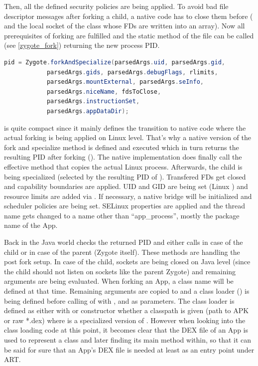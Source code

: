 Then, all the defined security policies are being applied. To avoid bad file
descriptor messages after forking a child, a native code has to close them before ( and the local socket  of the
 class whose FDs are written into an 
array).
Now all prerequisites of forking are fulfilled and the static method
 of the  file can be called
(see \autoref{zygote_fork}) returning the new process PID.
\begin{lstlisting}[language=Java, caption=Zygote Fork Call, label=zygote_fork]
pid = Zygote.forkAndSpecialize(parsedArgs.uid, parsedArgs.gid,
            parsedArgs.gids, parsedArgs.debugFlags, rlimits,
            parsedArgs.mountExternal, parsedArgs.seInfo,
            parsedArgs.niceName, fdsToClose,
            parsedArgs.instructionSet,
            parsedArgs.appDataDir);
\end{lstlisting}
 is quite compact since it mainly defines the transition
to native code where the actual forking is being applied on Linux level. That's why
a native version of the fork and specialize method is defined and executed
which in turn returns the resulting PID after forking
().
The native implementation does finally call the effective  method
that copies the actual Linux process. Afterwards, the child is being
specialized (selected by the resulting PID of ).
Transfered FDs get closed and capability boundaries are applied.
UID and GID are being set (Linux ) and resource limits are added via .
If necessary, a native bridge will be initialized and scheduler policies
are being set. SELinux properties are applied and the thread name gets
changed to a name other than ``app\_process'', mostly the package name of the App.

Back in the Java world  checks the returned PID and either calls  in case of the child or
 in case of the parent (Zygote itself).
These methods are handling the post fork setup. In case of the child, sockets are being closed on Java level (since the child should not listen on sockets like the parent Zygote) and remaining arguments are being evaluated. When forking an App, a class name will be defined at that time. Remaining arguments are copied to  and a class loader () is being defined before calling  of  with ,  and  as parameters. The class loader  is defined as
either with  or  constructor whether a classpath is
given (path to APK or raw *.dex) where  is a specialized version of .
However when looking into the class loading code at this point, it becomes clear that the DEX file of an App is used to represent a class and later finding its main method within, so that
it can be said for sure that an App's DEX file is needed at least as an entry point under ART.

